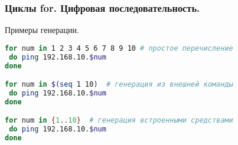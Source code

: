\begin{frame}[fragile]
\frametitle{Циклы for. Цифровая последовательность.}
  \begin{block}{Примеры генерации.}
\begin{lstlisting}[language=bash,frame=single]
for num in 1 2 3 4 5 6 7 8 9 10 # простое перечисление 
 do ping 192.168.10.$num
done

for num in $(seq 1 10)  # генерация из внешней команды
 do ping 192.168.10.$num
done

for num in {1..10}  # генерация встроенными средствами
 do ping 192.168.10.$num
done

\end{lstlisting}
  \end{block}
\end{frame}
